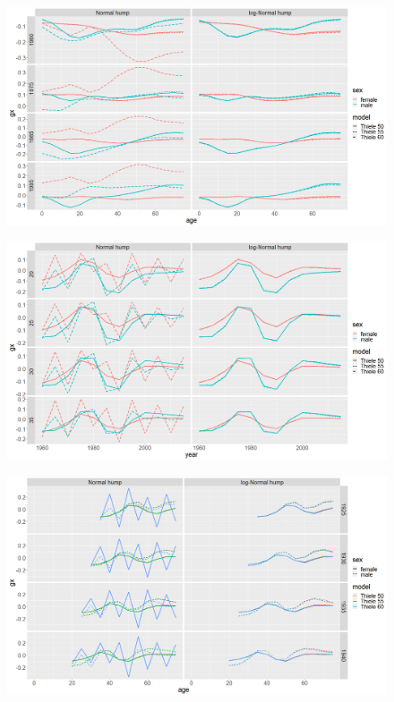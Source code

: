 \documentclass[12pt,a4paper]{article}
\begin{document}
\newpage
\begin{figure}[H]
\includegraphics[width = \linewidth]{mig.png}
\end{figure}
\begin{figure}[H]
\includegraphics[width = \linewidth]{age mig.png}
\end{figure}

\newpage
\begin{figure}[H]
\includegraphics[width = \linewidth]{cohort mig.png}
\end{figure}
\end{document}
